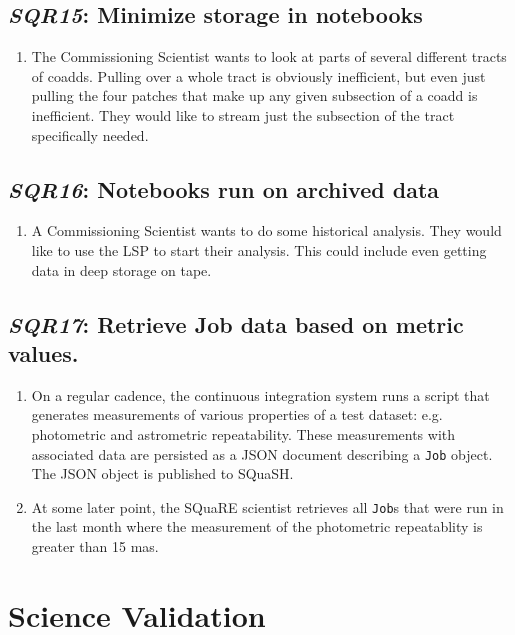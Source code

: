 \documentclass[DM,toc,lsstdraft]{lsstdoc}
\newcommand{\usecase}[3]{%
\subsection{\emph{#1}: #2}
\label{use:#1}
\begin{enumerate}[label=\alph*.]
#3
\end{enumerate}
}
\begin{document}
\usecase{SQR15}{Minimize storage in notebooks}{%

\item
The Commissioning Scientist wants to look at parts of several different tracts of coadds.
Pulling over a whole tract is obviously inefficient, but even just pulling the four patches that make up any given subsection of a coadd is inefficient.
They would like to stream just the subsection of the tract specifically needed.

}

\usecase{SQR16}{Notebooks run on archived data}{%

\item
A Commissioning Scientist wants to do some historical analysis.
They would like to use the LSP to start their analysis.
This could include even getting data in deep storage on tape.

}

\usecase{SQR17}{Retrieve Job data based on metric values.}{%

\item
On a regular cadence, the continuous integration system runs a script that generates measurements of various properties of a test dataset: e.g. photometric and astrometric repeatability.
These measurements with associated data are persisted as a JSON document describing a \texttt{Job} object.
The JSON object is published to SQuaSH.

\item
At some later point, the SQuaRE scientist retrieves all \texttt{Job}s that were run in the last month where the measurement of the photometric repeatablity is greater than 15 mas.

}

\section{Science Validation}
\end{document}
